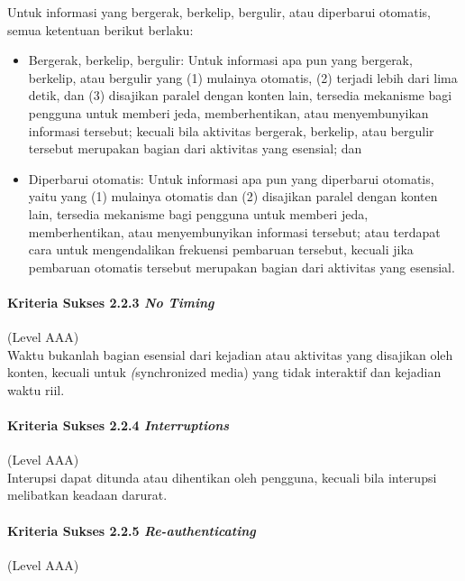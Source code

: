Untuk informasi yang bergerak, berkelip, bergulir, atau diperbarui otomatis, semua ketentuan berikut berlaku:
\begin{itemize}
	\item Bergerak, berkelip, bergulir: Untuk informasi apa pun yang bergerak, berkelip, atau bergulir yang (1) mulainya otomatis, (2) terjadi lebih dari lima detik, dan (3) disajikan paralel dengan konten lain, tersedia mekanisme bagi pengguna untuk memberi jeda, memberhentikan, atau menyembunyikan informasi tersebut; kecuali bila aktivitas bergerak, berkelip, atau bergulir tersebut merupakan bagian dari aktivitas yang esensial; dan
	\item Diperbarui otomatis: Untuk informasi apa pun yang diperbarui otomatis, yaitu yang (1) mulainya otomatis dan (2) disajikan paralel dengan konten lain, tersedia mekanisme bagi pengguna untuk memberi jeda, memberhentikan, atau menyembunyikan informasi tersebut; atau terdapat cara untuk mengendalikan frekuensi pembaruan tersebut, kecuali jika pembaruan otomatis tersebut merupakan bagian dari aktivitas yang esensial.
\end{itemize}

\paragraph{Kriteria Sukses 2.2.3 \textit{No Timing}}
\label{sec:kriteria_sukses_2.2.3}
(Level AAA)\\

Waktu bukanlah bagian esensial dari kejadian atau aktivitas yang disajikan oleh konten, kecuali untuk \textit(synchronized media) yang tidak interaktif dan kejadian waktu riil.

\paragraph{Kriteria Sukses 2.2.4 \textit{Interruptions}}
\label{sec:kriteria_sukses_2.2.4}
(Level AAA)\\

Interupsi dapat ditunda atau dihentikan oleh pengguna, kecuali bila interupsi melibatkan keadaan darurat.

\paragraph{Kriteria Sukses 2.2.5 \textit{Re-authenticating}}
\label{sec:kriteria_sukses_2.2.5}
(Level AAA)\\

